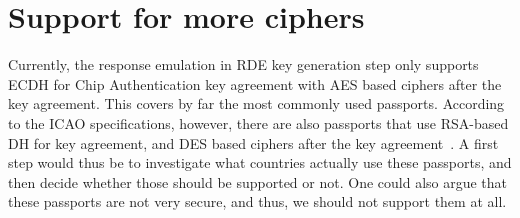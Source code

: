  \section{Support for more ciphers}
\label{sec:support-for-more-ciphers}
Currently, the response emulation in RDE key generation step only supports ECDH for Chip Authentication key agreement with AES based ciphers after the key agreement.
This covers by far the most commonly used passports.
According to the ICAO specifications, however, there are also passports that use RSA-based DH for key agreement, and DES based ciphers after the key agreement~\cite{icao9303securitymechanisms}.
A first step would thus be to investigate what countries actually use these passports, and then decide whether those should be supported or not.
One could also argue that these passports are not very secure, and thus, we should not support them at all.
